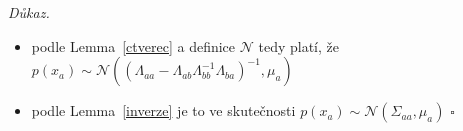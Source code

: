 \documentclass{article}
\newenvironment{pitemize}{
\begin{itemize}
  \setlength{\itemsep}{5pt}
  \setlength{\parskip}{0pt}
  \setlength{\parsep}{0pt}
}{\end{itemize}}
\newenvironment{pproof}{
\noindent\emph{Důkaz.}
\begin{pitemize}
}{\hfill$\square$\end{pitemize}}
\newcommand{\NN}{\mathcal{N}}
\theoremstyle{definition}
\begin{document}
\begin{pproof}
\begin {itemize}
$+
x_a^T\left(-\frac{1}{2}\Lambda_{aa}\right)x_a+
x_a^T\left(\Lambda_{aa}\mu_a\right)+c_5=$


$=
x_a^T \left(\Lambda_{aa}\mu_a-\Lambda_{ab}\Lambda_{bb}^{-1} \Lambda_{ba}\mu_a\right)+
x_a^T\left (\frac{1}{2}\Lambda_{ab}\Lambda_{bb}^{-1}\Lambda_{ba}
-\frac{1}{2}\Lambda_{aa}\right)x_a+c_5=$

$=-\frac{1}{2}x_a^T\left (\Lambda_{aa}-\Lambda_{ab}\Lambda_{bb}^{-1}\Lambda_{ba}
\right)x_a+x_a^T \left(\left(\Lambda_{aa}-\Lambda_{ab}\Lambda_{bb}^{-1} \Lambda_{ba}\right)\mu_a\right)+c_5$

\end {itemize}
\item podle Lemma~\ref{ctverec} a definice $\NN$ tedy platí, že $p\left(x_a\right)\sim\NN\left(
\left(\Lambda_{aa}-\Lambda_{ab}\Lambda_{bb}^{-1} \Lambda_{ba}\right)^{-1},\mu_a
\right)$

\item podle Lemma~\ref{inverze} je to ve skutečnosti $p\left(x_a\right)\sim\NN\left(\Sigma_{aa},\mu_a
\right)$ 
\end{pproof}
\end{document}
